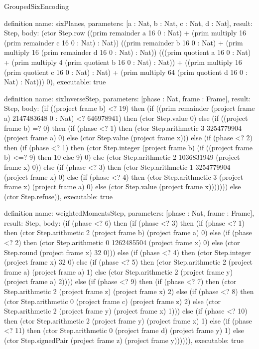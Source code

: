 \begin{lexlean}{GroupedSixEncoding}
\begin{semanticmodule}
definition{
  name: sixPlanes,
  parameters: [a : Nat, b : Nat, c : Nat, d : Nat],
  result: Step,
  body: (ctor Step.row ((prim remainder a 16 0 : Nat) + (prim multiply 16 (prim remainder c 16 0 : Nat) : Nat)) ((prim remainder b 16 0 : Nat) + (prim multiply 16 (prim remainder d 16 0 : Nat) : Nat)) (((prim quotient a 16 0 : Nat) + (prim multiply 4 (prim quotient b 16 0 : Nat) : Nat)) + ((prim multiply 16 (prim quotient c 16 0 : Nat) : Nat) + (prim multiply 64 (prim quotient d 16 0 : Nat) : Nat))) 0),
  executable: true
}

definition{
  name: sixInverseStep,
  parameters: [phase : Nat, frame : Frame],
  result: Step,
  body: (if ((project frame b) <? 19) then (if ((prim remainder (project frame a) 2147483648 0 : Nat) <? 646978941) then (ctor Step.value 0) else (if ((project frame b) =? 0) then (if (phase <? 1) then (ctor Step.arithmetic 3 3254779904 (project frame a) 0) else (ctor Step.value (project frame x))) else (if (phase <? 2) then (if (phase <? 1) then (ctor Step.integer (project frame b) (if ((project frame b) <=? 9) then 10 else 9) 0) else (ctor Step.arithmetic 2 1036831949 (project frame x) 0)) else (if (phase <? 3) then (ctor Step.arithmetic 1 3254779904 (project frame x) 0) else (if (phase <? 4) then (ctor Step.arithmetic 3 (project frame x) (project frame a) 0) else (ctor Step.value (project frame x))))))) else (ctor Step.refuse)),
  executable: true
}

definition{
  name: weightedMomentsStep,
  parameters: [phase : Nat, frame : Frame],
  result: Step,
  body: (if (phase <? 6) then (if (phase <? 3) then (if (phase <? 1) then (ctor Step.arithmetic 2 (project frame b) (project frame a) 0) else (if (phase <? 2) then (ctor Step.arithmetic 0 1262485504 (project frame x) 0) else (ctor Step.round (project frame x) 32 0))) else (if (phase <? 4) then (ctor Step.integer (project frame x) 32 0) else (if (phase <? 5) then (ctor Step.arithmetic 2 (project frame a) (project frame a) 1) else (ctor Step.arithmetic 2 (project frame y) (project frame a) 2)))) else (if (phase <? 9) then (if (phase <? 7) then (ctor Step.arithmetic 2 (project frame z) (project frame x) 2) else (if (phase <? 8) then (ctor Step.arithmetic 0 (project frame c) (project frame z) 2) else (ctor Step.arithmetic 2 (project frame y) (project frame x) 1))) else (if (phase <? 10) then (ctor Step.arithmetic 2 (project frame y) (project frame x) 1) else (if (phase <? 11) then (ctor Step.arithmetic 0 (project frame d) (project frame y) 1) else (ctor Step.signedPair (project frame z) (project frame y)))))),
  executable: true
}


\end{semanticmodule}
\end{lexlean}

